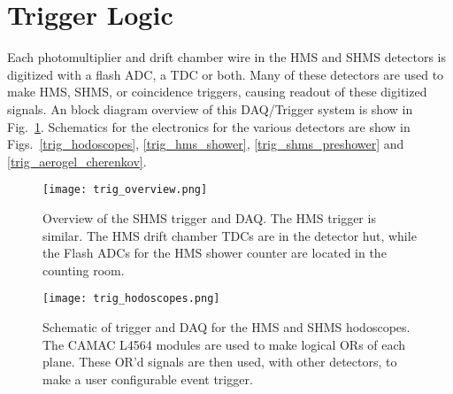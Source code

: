 {{%

\section{Trigger Logic}
Each photomultiplier and drift chamber wire in the HMS and SHMS detectors
is digitized with a flash ADC, a TDC or both.  Many of these detectors are
used to make HMS, SHMS, or coincidence triggers, causing readout of these
digitized signals.  An block diagram overview of this DAQ/Trigger system is
show in Fig.~\ref{fig:trig_overview}.  Schematics for the electronics for
the various detectors are show in Figs.~\ref{trig_hodoscopes},
\ref{trig_hms_shower}, \ref{trig_shms_preshower} and
\ref{trig_aerogel_cherenkov}.

\begin{figure}
\texttt{[image: trig\_overview.png]}
\caption{\label{fig:trig_overview}
Overview of the SHMS trigger and DAQ.  The HMS trigger is similar.
The HMS drift chamber TDCs are in the detector hut, while the Flash ADCs
for the HMS shower counter are located in the counting room.}
\end{figure}

\begin{figure}
\texttt{[image: trig\_hodoscopes.png]}
\caption{\label{fig:trig_hodoscopes}
Schematic of trigger and DAQ for the HMS and SHMS hodoscopes.  The CAMAC
L4564 modules are used to make logical ORs of each plane.  These OR'd signals
are then used, with other detectors, to make a user configurable event trigger.
}
\end{figure}

}}
